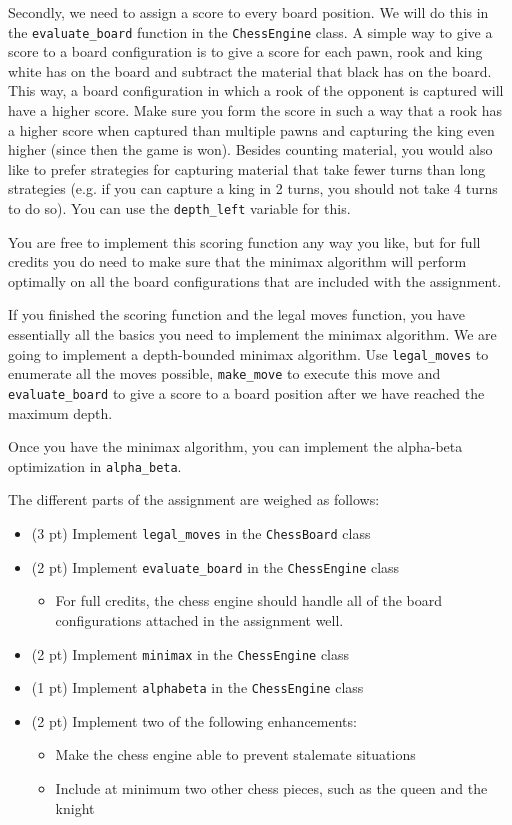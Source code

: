 \documentclass{article}
\begin{document}
Secondly, we need to assign a score to every board position. We will do this in the \texttt{evaluate\_board} function in the \texttt{ChessEngine} class. A simple way to give a score to a board configuration is to give a score for each pawn, rook and king white has on the board and subtract the material that black has on the board. This way, a board configuration in which a rook of the opponent is captured will have a higher score. Make sure you form the score in such a way that a rook has a higher score when captured than multiple pawns and capturing the king even higher (since then the game is won).
Besides counting material, you would also like to prefer strategies for capturing material that take fewer turns than long strategies (e.g. if you can capture a king in 2 turns, you should not take 4 turns to do so). You can use the \texttt{depth\_left} variable for this.

You are free to implement this scoring function any way you like, but for full credits you do need to make sure that the minimax algorithm will perform optimally on all the board configurations that are included with the assignment.

If you finished the scoring function and the legal moves function, you have essentially all the basics you need to implement the minimax algorithm. We are going to implement a depth-bounded minimax algorithm.  Use \texttt{legal\_moves} to enumerate all the moves possible, \texttt{make\_move} to execute this move and \texttt{evaluate\_board} to give a score to a board position after we have reached the maximum depth.

Once you have the minimax algorithm, you can implement the alpha-beta optimization in \texttt{alpha\_beta}.

The different parts of the assignment are weighed as follows:
\begin{itemize}
    \item (3 pt) Implement \texttt{legal\_moves} in the \texttt{ChessBoard} class
    \item (2 pt) Implement \texttt{evaluate\_board} in the \texttt{ChessEngine} class
        \begin{itemize}
            \item For full credits, the chess engine should handle all of the board configurations attached in the assignment well.
        \end{itemize}
    \item (2 pt) Implement \texttt{minimax} in the \texttt{ChessEngine} class
    \item (1 pt) Implement \texttt{alphabeta} in the \texttt{ChessEngine} class
    \item (2 pt) Implement two of the following enhancements:
        \begin{itemize}           
            \item Make the chess engine able to prevent stalemate situations
            \item Include at minimum two other chess pieces, such as the queen and the knight
        \end{itemize}
\end{itemize}
\end{document}
